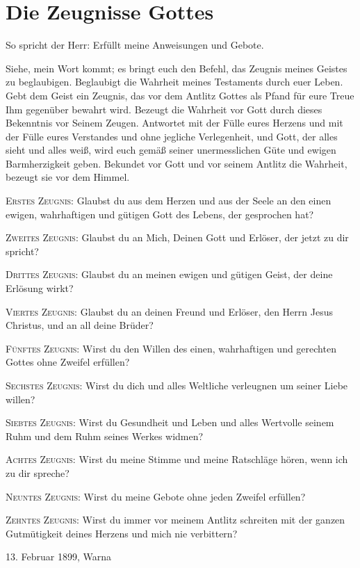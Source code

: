 \raggedbottom
\chapter{Die Zeugnisse Gottes}

So spricht der Herr: Erfüllt meine Anweisungen und Gebote.

Siehe, mein Wort kommt; es bringt euch den Befehl, das Zeugnis meines Geistes zu beglaubigen. Beglaubigt die Wahrheit meines Testaments durch euer Leben. Gebt dem Geist ein Zeugnis, das vor dem Antlitz Gottes als Pfand für eure Treue Ihm gegenüber bewahrt wird. Bezeugt die Wahrheit vor Gott durch dieses Bekenntnis vor Seinem Zeugen. Antwortet mit der Fülle eures Herzens und mit der Fülle eures Verstandes und ohne jegliche Verlegenheit, und Gott, der alles sieht und alles weiß, wird euch gemäß seiner unermesslichen Güte und ewigen Barmherzigkeit geben. Bekundet vor Gott und vor seinem Antlitz die Wahrheit, bezeugt sie vor dem Himmel.

\textsc{Erstes Zeugnis:} Glaubst du aus dem Herzen und aus der Seele an den einen ewigen, wahrhaftigen und gütigen Gott des Lebens, der gesprochen hat?

\textsc{Zweites Zeugnis:} Glaubst du an Mich, Deinen Gott und Erlöser, der jetzt zu dir spricht?

\textsc{Drittes Zeugnis:} Glaubst du an meinen ewigen und gütigen Geist, der deine Erlösung wirkt?

\textsc{Viertes Zeugnis:} Glaubst du an deinen Freund und Erlöser, den Herrn Jesus Christus, und an all deine Brüder?

\textsc{Fünftes Zeugnis:} Wirst du den Willen des einen, wahrhaftigen und gerechten Gottes ohne Zweifel erfüllen?

\textsc{Sechstes Zeugnis:} Wirst du dich und alles Weltliche verleugnen um seiner Liebe willen?

\textsc{Siebtes Zeugnis:} Wirst du Gesundheit und Leben und alles Wertvolle seinem Ruhm und dem Ruhm seines Werkes widmen?

\textsc{Achtes Zeugnis:} Wirst du meine Stimme und meine Ratschläge hören, wenn ich zu dir spreche?

\textsc{Neuntes Zeugnis:} Wirst du meine Gebote ohne jeden Zweifel erfüllen?

\textsc{Zehntes Zeugnis:} Wirst du immer vor meinem Antlitz schreiten mit der ganzen Gutmütigkeit deines Herzens und mich nie verbittern?

13. Februar 1899, Warna